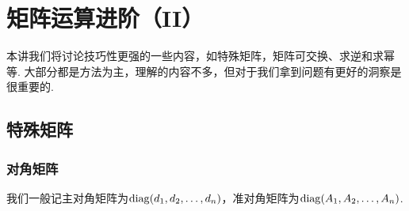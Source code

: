 \chapter{矩阵运算进阶（II）}

本讲我们将讨论技巧性更强的一些内容，如特殊矩阵，矩阵可交换、求逆和求幂等.
大部分都是方法为主，理解的内容不多，但对于我们拿到问题有更好的洞察是很重要的.

\section{特殊矩阵}
\subsection{对角矩阵}
我们一般记主对角矩阵为$\operatorname{diag}(d_1,d_2,\dots,d_n)$，准对角矩阵为$\operatorname{diag}(A_1,A_2,\dots,A_n)$.
